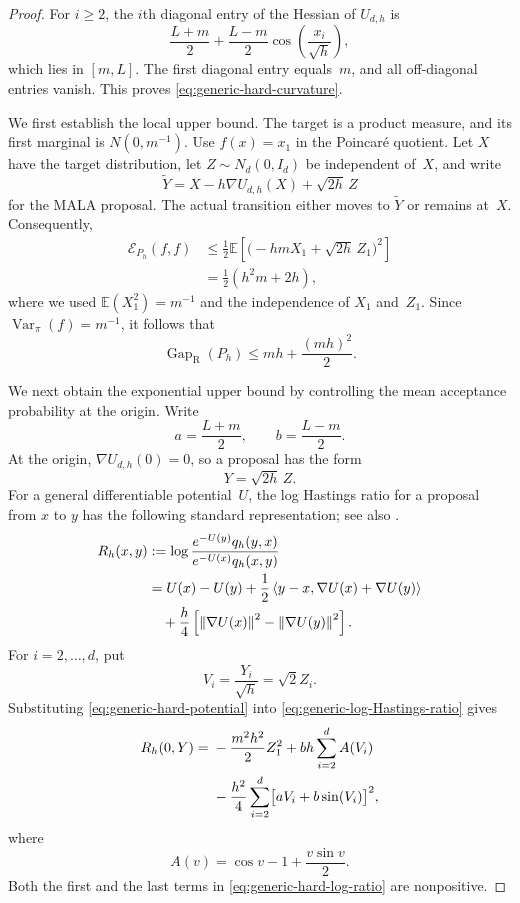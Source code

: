 \documentclass[11pt]{article}
\newcommand{\E}{\mathbb E}
\newcommand{\Var}{\operatorname{Var}}
\newcommand{\Gap}{\operatorname{Gap}_{\mathrm{R}}}
\newcommand{\cE}{\mathcal E}
\newcommand{\ip}[2]{\left\langle #1,#2\right\rangle}
\newcommand{\norm}[1]{\left\lVert #1\right\rVert}
\newcommand{\1}{\mathbf 1}
\begin{document}
	\begin{proof}
		For $i\geq2$, the $i$th diagonal entry of the Hessian of
		$U_{d,h}$ is
		\[
		\frac{L+m}{2}
		+\frac{L-m}{2}
		\cos\left(\frac{x_i}{\sqrt h}\right),
		\]
		which lies in $[m,L]$.  The first diagonal entry equals~$m$, and
		all off-diagonal entries vanish.  This proves
		\eqref{eq:generic-hard-curvature}.
		
		We first establish the local upper bound.  The target is a product
		measure, and its first marginal is $N(0,m^{-1})$.  Use
		$f(x)=x_1$ in the Poincar\'e quotient.  Let $X$ have the target
		distribution, let $Z\sim N_d(0,I_d)$ be independent of~$X$, and
		write
		\[
		\widetilde Y
		=X-h\nabla U_{d,h}(X)+\sqrt{2h}\,Z
		\]
		for the MALA proposal.  The actual transition either moves to
		$\widetilde Y$ or remains at~$X$.  Consequently,
		\begin{align*}
			\cE_{P_h}(f,f)
			&\leq
			\frac12\E\left[
			\bigl(-hmX_1+\sqrt{2h}\,Z_1\bigr)^2
			\right]\\
			&=\frac12\left(h^2m+2h\right),
		\end{align*}
		where we used $\E(X_1^2)=m^{-1}$ and the independence of
		$X_1$ and~$Z_1$.  Since $\Var_\pi(f)=m^{-1}$, it follows that
		\begin{equation}
			\label{eq:generic-local-upper}
			\Gap(P_h)
			\leq
			mh+\frac{(mh)^2}{2}.
		\end{equation}
		
		We next obtain the exponential upper bound by controlling the mean
		acceptance probability at the origin.  Write
		\[
		a=\frac{L+m}{2},
		\qquad
		b=\frac{L-m}{2}.
		\]
		At the origin, $\nabla U_{d,h}(0)=0$, so a proposal has the form
		\[
		Y=\sqrt{2h}\,Z.
		\]
		For a general differentiable potential~\(U\), the log Hastings ratio
		for a proposal from \(x\) to \(y\) has the following standard
		representation; see also
		\citet[Proposition~1.3, equation~(1.33)]{Eberle2014}.
		\begin{align}
			R_h(x,y)
			&:=\log
			\frac{e^{-U(y)}q_h(y,x)}
			{e^{-U(x)}q_h(x,y)}
			\notag\\
			&=U(x)-U(y)
			+\frac12
			\ip{y-x}{\nabla U(x)+\nabla U(y)}
			\notag\\
			&\quad
			+\frac h4\left[
			\norm{\nabla U(x)}^2
			-\norm{\nabla U(y)}^2
			\right].
			\label{eq:generic-log-Hastings-ratio}
		\end{align}
		For $i=2,\ldots,d$, put
		\[
		V_i=\frac{Y_i}{\sqrt h}=\sqrt2Z_i.
		\]
		Substituting \eqref{eq:generic-hard-potential} into
		\eqref{eq:generic-log-Hastings-ratio} gives
		\begin{align}
			R_h(0,Y)
			={}&-\frac{m^2h^2}{2}Z_1^2
			+bh\sum_{i=2}^d A(V_i)
			\notag\\
			&-\frac{h^2}{4}\sum_{i=2}^d
			\bigl[aV_i+b\sin(V_i)\bigr]^2,
			\label{eq:generic-hard-log-ratio}
		\end{align}
		where
		\[
		A(v)=\cos v-1+\frac{v\sin v}{2}.
		\]
		Both the first and the last terms in
		\eqref{eq:generic-hard-log-ratio} are nonpositive.
		

\end{proof}
\end{document}
